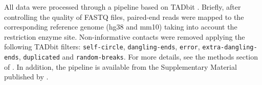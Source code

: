 \documentclass[a4,center,fleqn]{NAR}
\begin{document}
%



All data were processed through a pipeline based on TADbit
\citep{serra2016structural}. Briefly, after controlling the quality of
FASTQ files, paired-end reads were mapped to the corresponding reference
genome (hg38 and mm10) taking into account the restriction enzyme site.
Non-informative contacts were removed applying the following TADbit
filters: \texttt{self-circle}, \texttt{dangling-ends}, \texttt{error},
\texttt{extra-dangling-ends}, \texttt{duplicated} and
\texttt{random-breaks}. For more details, see the methods section of
\cite{stadhouders2017transcription}. In addition, the pipeline is
available from the Supplementary Material published by
\cite{quilez2017managing}.
\end{document}
